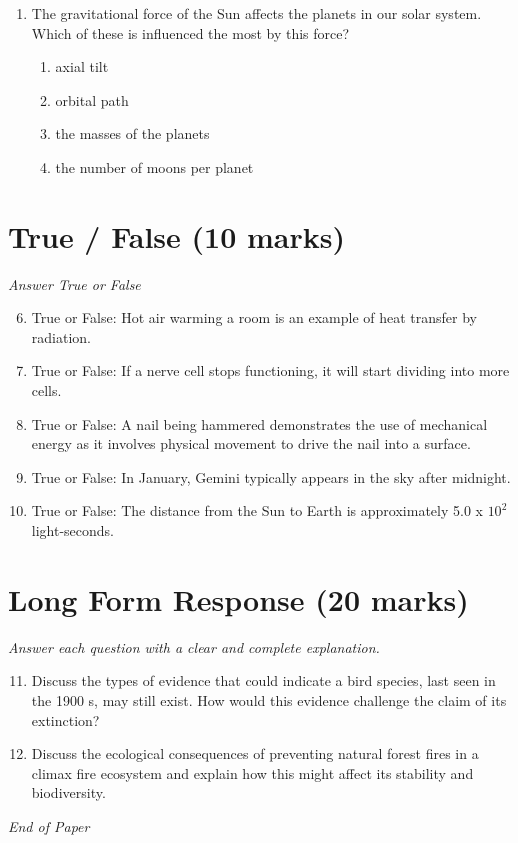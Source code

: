 \documentclass[12pt]{article}
\begin{document}
\begin{enumerate}[label=\arabic*.]
\begin{enumerate}[label=(\alph*)]
    \item an increase in the motion of the copper particles
    \item a decrease in the distance between the copper particles
\end{enumerate}
\item The gravitational force of the Sun affects the planets in our solar system. Which of these is influenced the most by this force?
\begin{enumerate}[label=(\alph*)]
    \item axial tilt
    \item orbital path
    \item the masses of the planets
    \item the number of moons per planet
\end{enumerate}
\end{enumerate}

\section*{True / False (10 marks)}
\textit{Answer True or False}
\begin{enumerate}[label=\arabic*.]
\setcounter{enumi}{5}
\item True or False: Hot air warming a room is an example of heat transfer by radiation.
\item True or False: If a nerve cell stops functioning, it will start dividing into more cells.
\item True or False: A nail being hammered demonstrates the use of mechanical energy as it involves physical movement to drive the nail into a surface.
\item True or False: In January, Gemini typically appears in the sky after midnight.
\item True or False: The distance from the Sun to Earth is approximately 5.0 x $10^2$ light-seconds.
\end{enumerate}

\section*{Long Form Response (20 marks)}
\textit{Answer each question with a clear and complete explanation.}
\begin{enumerate}[label=\arabic*.]
\setcounter{enumi}{10}
\item Discuss the types of evidence that could indicate a bird species, last seen in the 1900 s, may still exist. How would this evidence challenge the claim of its extinction?
\item Discuss the ecological consequences of preventing natural forest fires in a climax fire ecosystem and explain how this might affect its stability and biodiversity.
\end{enumerate}

\vfill
\noindent\textit{End of Paper}
\end{document}
